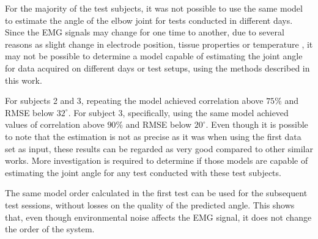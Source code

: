 \documentclass[letterpaper, 10 pt, conference]{ieeeconf}  %
\begin{document}

For the majority of the test subjects, it was not possible to use the same model to estimate the angle of the elbow joint for tests conducted in different days. Since the EMG signals may change for one time to another, due to several reasons as slight change in electrode position, tissue properties or temperature \cite{soderberg1975}, it may not be possible to determine a model capable of estimating the joint angle for data acquired on different days or test setups, using the methods described in this work.

\addtolength{\textheight}{-4.5cm}   %

For subjects 2 and 3, repeating the model achieved correlation above $75\%$ and RMSE below $32^\circ$. For subject 3, specifically, using the same model achieved values of correlation above $90\%$ and RMSE below $20^\circ$. Even though it is possible to note that the estimation is not as precise as it was when using the first data set as input, these results can be regarded as very good compared to other similar works. More investigation is required to determine if those models are capable of estimating the joint angle for any test conducted with these test subjects.
% 
% 

% 
% 

The same model order calculated in the first test can be used for the subsequent test sessions, without losses on the quality of the predicted angle. This shows that, even though environmental noise affects the EMG signal, it does not change the order of the system.
\end{document}
